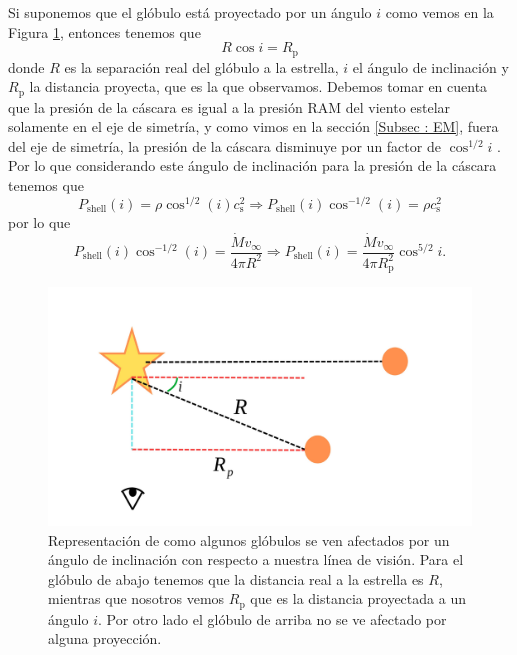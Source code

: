 \documentclass{book}
\begin{document}
Si suponemos que el glóbulo está proyectado por un ángulo $i$ como vemos en la Figura \ref{Ang proyeccion}, entonces tenemos que 
\begin{equation}
R\cos i=R_\mathrm{p}
\end{equation}\label{eq:sep_real}
\noindent donde $R$ es la separación real del glóbulo a la estrella, $i$ el ángulo de inclinación y $R_\mathrm{p}$ la distancia proyecta, que es la que observamos. Debemos tomar en cuenta que la presión de la cáscara es igual a la presión RAM del viento estelar solamente en el eje de simetría, y como vimos en la sección \ref{Subsec : EM}, fuera del eje de simetría, la presión de la cáscara disminuye por un factor de $\cos^{1/2}i$ \citep{Tarango:2018}. Por lo que considerando este ángulo de inclinación para la presión de la cáscara tenemos que
\begin{equation}
    P_\mathrm{shell}(i)=\rho\cos^{1/2}(i) c_\mathrm{s}^2 \Rightarrow P_\mathrm{shell}(i)\cos^{-1/2}(i)=\rho c_\mathrm{s}^2 
\end{equation}
por lo que  
\begin{equation}
P_\mathrm{shell}(i)\cos^{-1/2}(i)=\frac{\dot{M}v_\infty}{4\pi R^2} \Rightarrow
P_\mathrm{shell}(i)=\frac{\dot{M}v_\infty}{4\pi R_\mathrm{p}^2}\cos^{5/2}i.
\end{equation}\label{eq:cos 5_2}

\begin{figure}[htb]
    \centering
    \includegraphics[width=\textwidth]{artesanales/ImgFi01-6.pdf}
    \caption{Representación de como algunos glóbulos se ven afectados por un ángulo de inclinación con respecto a nuestra línea de visión. Para el glóbulo de abajo tenemos que la distancia real a la estrella es $R$, mientras que nosotros vemos $R_\mathrm{p}$ que es la distancia proyectada a un ángulo $i$. Por otro lado el glóbulo de arriba no se ve afectado por alguna proyección.}
    \label{Ang proyeccion}
\end{figure}
\end{document}

